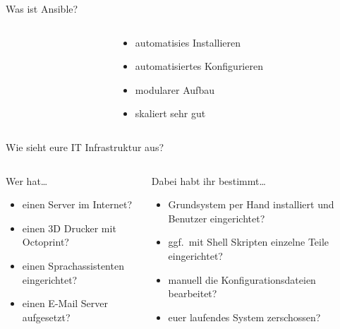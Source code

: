 \documentclass[aspectratio=169]{beamer}
\begin{document}
\begin{frame}{Was ist Ansible?}
\begin{columns}
\begin{column}{0.2\textwidth}
        \end{column}
        \begin{column}{0.4\textwidth}
            \begin{itemize}
                \item automatisies Installieren
                \item automatisiertes Konfigurieren
                \item modularer Aufbau
                \item skaliert sehr gut
            \end{itemize}
        \end{column}
    \end{columns}
\end{frame}


\begin{frame}{Wie sieht eure IT Infrastruktur aus?}
    \begin{columns}
        \begin{column}{0.5\textwidth}
            Wer hat\ldots
                \begin{itemize}
                    \item einen Server im Internet?
                    \item einen 3D Drucker mit Octoprint?
                    \item einen Sprachassistenten eingerichtet?
                    \item einen E-Mail Server aufgesetzt? 
                \end{itemize}
        \end{column}
        \pause
        \begin{column}{0.5\textwidth}
             Dabei habt ihr bestimmt\ldots
                \begin{itemize}
                    \item Grundsystem per Hand installiert und Benutzer eingerichtet?
                    \item ggf.\ mit Shell Skripten einzelne Teile eingerichtet?
                    \item manuell die Konfigurationsdateien bearbeitet?
                    \item euer laufendes System zerschossen?
                \end{itemize}
        \end{column}
    \end{columns}
\end{frame}
\end{document}
